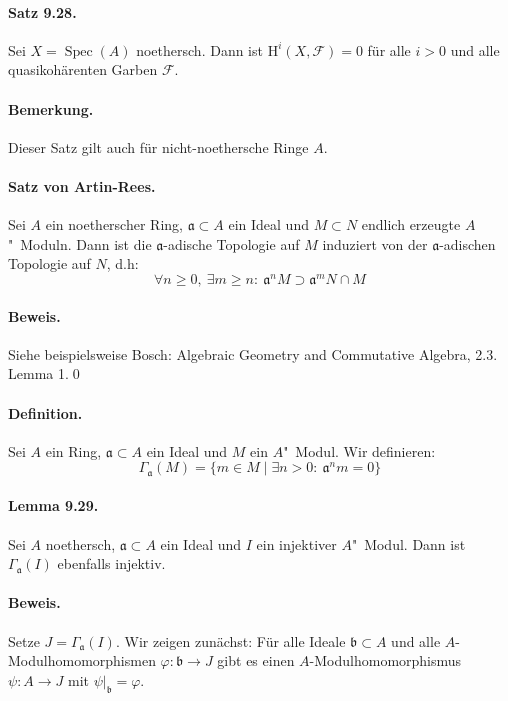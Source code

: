 \paragraph{Satz 9.28.}\label{9.28} Sei $X=\operatorname{Spec}(A)$ noethersch. Dann ist $\mathrm{H}^i(X,\mathcal{F})=0$ für alle $i>0$ und alle quasikohärenten Garben $\mathcal{F}$.

\paragraph{Bemerkung.} Dieser Satz gilt auch für nicht-noethersche Ringe $A$.

\paragraph{Satz von Artin-Rees.}\label{prop:artin-rees} Sei $A$ ein noetherscher Ring, $\mathfrak{a}\subset A$ ein Ideal und $M\subset N$ endlich erzeugte $A$"~Moduln. Dann ist die $\mathfrak{a}$-adische Topologie auf $M$ induziert von der $\mathfrak{a}$-adischen Topologie auf $N$, d.h:
\[\forall n\geq 0,\ \exists m\geq n:\ \mathfrak{a}^nM\supset\mathfrak{a}^mN\cap M \]

\paragraph{Beweis.} Siehe beispielsweise Bosch: Algebraic Geometry and Commutative Algebra, 2.3. Lemma 1.\qed

\paragraph{Definition.} Sei $A$ ein Ring, $\mathfrak{a}\subset A$ ein Ideal und $M$ ein $A$"~Modul. Wir definieren:
\[\Gamma_\mathfrak{a}(M)=\{m\in M\mid\exists n>0:\ \mathfrak{a}^nm=0 \} \]

\paragraph{Lemma 9.29.}\label{9.29} Sei $A$ noethersch, $\mathfrak{a}\subset A$ ein Ideal und $I$ ein injektiver $A$"~Modul. Dann ist $\Gamma_\mathfrak{a}(I)$ ebenfalls injektiv.

\paragraph{Beweis.} Setze $J=\Gamma_\mathfrak{a}(I)$. Wir zeigen zunächst: Für alle Ideale $\mathfrak{b}\subset A$ und alle $A$-Modulhomomorphismen $\varphi:\mathfrak{b}\to J$ gibt es einen $A$-Modulhomomorphismus $\psi:A\to J$ mit $\psi|_\mathfrak{b}=\varphi$.

